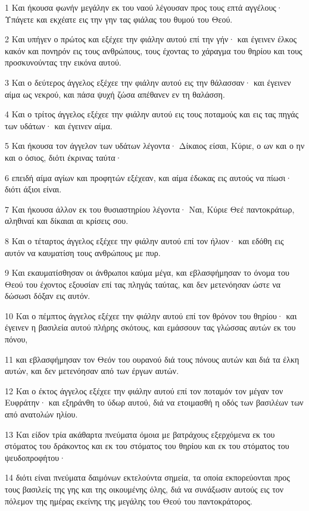 \par 1 Και ήκουσα φωνήν μεγάλην εκ του ναού λέγουσαν προς τους επτά αγγέλους· Υπάγετε και εκχέατε εις την γην τας φιάλας του θυμού του Θεού.
\par 2 Και υπήγεν ο πρώτος και εξέχεε την φιάλην αυτού επί την γήν· και έγεινεν έλκος κακόν και πονηρόν εις τους ανθρώπους, τους έχοντας το χάραγμα του θηρίου και τους προσκυνούντας την εικόνα αυτού.
\par 3 Και ο δεύτερος άγγελος εξέχεε την φιάλην αυτού εις την θάλασσαν· και έγεινεν αίμα ως νεκρού, και πάσα ψυχή ζώσα απέθανεν εν τη θαλάσση.
\par 4 Και ο τρίτος άγγελος εξέχεε την φιάλην αυτού εις τους ποταμούς και εις τας πηγάς των υδάτων· και έγεινεν αίμα.
\par 5 Και ήκουσα τον άγγελον των υδάτων λέγοντα· Δίκαιος είσαι, Κύριε, ο ων και ο ην και ο όσιος, διότι έκρινας ταύτα·
\par 6 επειδή αίμα αγίων και προφητών εξέχεαν, και αίμα έδωκας εις αυτούς να πίωσι· διότι άξιοι είναι.
\par 7 Και ήκουσα άλλον εκ του θυσιαστηρίου λέγοντα· Ναι, Κύριε Θεέ παντοκράτωρ, αληθιναί και δίκαιαι αι κρίσεις σου.
\par 8 Και ο τέταρτος άγγελος εξέχεε την φιάλην αυτού επί τον ήλιον· και εδόθη εις αυτόν να καυματίση τους ανθρώπους με πυρ.
\par 9 Και εκαυματίσθησαν οι άνθρωποι καύμα μέγα, και εβλασφήμησαν το όνομα του Θεού του έχοντος εξουσίαν επί τας πληγάς ταύτας, και δεν μετενόησαν ώστε να δώσωσι δόξαν εις αυτόν.
\par 10 Και ο πέμπτος άγγελος εξέχεε την φιάλην αυτού επί τον θρόνον του θηρίου· και έγεινεν η βασιλεία αυτού πλήρης σκότους, και εμάσσουν τας γλώσσας αυτών εκ του πόνου,
\par 11 και εβλασφήμησαν τον Θεόν του ουρανού διά τους πόνους αυτών και διά τα έλκη αυτών, και δεν μετενόησαν από των έργων αυτών.
\par 12 Και ο έκτος άγγελος εξέχεε την φιάλην αυτού επί τον ποταμόν τον μέγαν τον Ευφράτην· και εξηράνθη το ύδωρ αυτού, διά να ετοιμασθή η οδός των βασιλέων των από ανατολών ηλίου.
\par 13 Και είδον τρία ακάθαρτα πνεύματα όμοια με βατράχους εξερχόμενα εκ του στόματος του δράκοντος και εκ του στόματος του θηρίου και εκ του στόματος του ψευδοπροφήτου·
\par 14 διότι είναι πνεύματα δαιμόνων εκτελούντα σημεία, τα οποία εκπορεύονται προς τους βασιλείς της γης και της οικουμένης όλης, διά να συνάξωσιν αυτούς εις τον πόλεμον της ημέρας εκείνης της μεγάλης του Θεού του παντοκράτορος.
